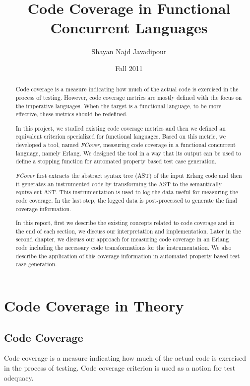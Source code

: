 \documentclass[12pt,a4paper]{report}
\title{Code Coverage in Functional Concurrent Languages}
\author{Shayan Najd Javadipour}
\date{Fall 2011}
\begin{document}
\maketitle
{}
\begin{abstract}
Code coverage is a measure indicating how much of the actual code is exercised in the process of testing. However, code coverage metrics are mostly defined with the focus on the imperative languages. When the target is a functional language, to be more effective, these metrics should be redefined.

In this project, we studied existing code coverage metrics and then we defined an equivalent criterion specialized for functional languages. Based on this metric, we developed a tool, named \emph{FCover}, measuring code coverage in a functional concurrent language, namely Erlang. We designed the tool in a way that its output can be used to define a stopping function for automated property based test case generation.

\emph{FCover} first extracts the abstract syntax tree (AST) of the input Erlang code and then it generates an instrumented code by transforming the AST to the semantically equivalent AST. This instrumentation is used to log the data useful for measuring the code coverage. In the last step, the logged data is post-processed to generate the final coverage information.  

In this report, first we describe the existing concepts related to code coverage and in the end of each section, we discuss our interpretation and implementation. Later in the second chapter, we discuss our approach for measuring code coverage in an Erlang code including the necessary code transformations for the instrumentation. We also describe the application of this coverage information in automated property based test case generation.
\end{abstract}
\tableofcontents
\chapter{Code Coverage in Theory}
\newpage
\section{Code Coverage}
Code coverage is a measure indicating how much of the actual code is exercised in the process of testing. Code coverage criterion is used as a notion for test adequacy.\cite{Zhu:1997:SUT:267580.267590}
\end{document}
